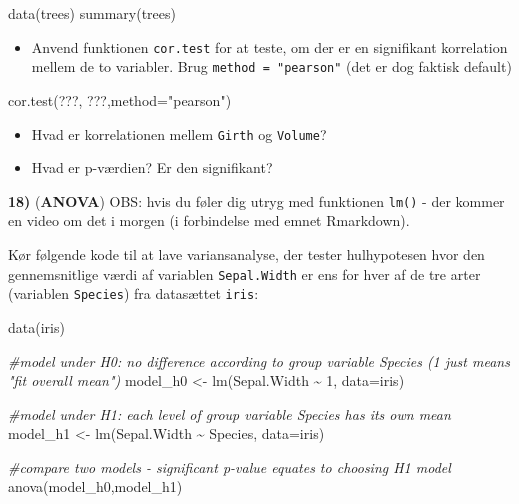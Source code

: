 \documentclass[
]{book}
\newenvironment{Shaded}{\begin{snugshade}}{\end{snugshade}}
\newcommand{\AttributeTok}[1]{\textcolor[rgb]{0.77,0.63,0.00}{#1}}
\newcommand{\CommentTok}[1]{\textcolor[rgb]{0.56,0.35,0.01}{\textit{#1}}}
\newcommand{\DecValTok}[1]{\textcolor[rgb]{0.00,0.00,0.81}{#1}}
\newcommand{\FunctionTok}[1]{\textcolor[rgb]{0.00,0.00,0.00}{#1}}
\newcommand{\NormalTok}[1]{#1}
\newcommand{\OtherTok}[1]{\textcolor[rgb]{0.56,0.35,0.01}{#1}}
\newcommand{\SpecialCharTok}[1]{\textcolor[rgb]{0.00,0.00,0.00}{#1}}
\newcommand{\StringTok}[1]{\textcolor[rgb]{0.31,0.60,0.02}{#1}}
\providecommand{\tightlist}{%
  \setlength{\itemsep}{0pt}\setlength{\parskip}{0pt}}
\begin{document}
\begin{Shaded}
\begin{Highlighting}[]
\FunctionTok{data}\NormalTok{(trees)}
\FunctionTok{summary}\NormalTok{(trees)}
\end{Highlighting}
\end{Shaded}

\begin{itemize}
\tightlist
\item
  Anvend funktionen \texttt{cor.test} for at teste, om der er en signifikant korrelation mellem de to variabler. Brug \texttt{method\ =\ "pearson"} (det er dog faktisk default)
\end{itemize}

\begin{Shaded}
\begin{Highlighting}[]
\FunctionTok{cor.test}\NormalTok{(???, ???,}\AttributeTok{method=}\StringTok{"pearson"}\NormalTok{)}
\end{Highlighting}
\end{Shaded}

\begin{itemize}
\tightlist
\item
  Hvad er korrelationen mellem \texttt{Girth} og \texttt{Volume}?
\item
  Hvad er p-værdien? Er den signifikant?
\end{itemize}

\textbf{18)} (\textbf{ANOVA}) OBS: hvis du føler dig utryg med funktionen \texttt{lm()} - der kommer en video om det i morgen (i forbindelse med emnet Rmarkdown).

Kør følgende kode til at lave variansanalyse, der tester hulhypotesen hvor den gennemsnitlige værdi af variablen \texttt{Sepal.Width} er ens for hver af de tre arter (variablen \texttt{Species}) fra datasættet \texttt{iris}:

\begin{Shaded}
\begin{Highlighting}[]
\FunctionTok{data}\NormalTok{(iris)}

\CommentTok{\#model under H0: no difference according to group variable Species (1 just means "fit overall mean")}
\NormalTok{model\_h0 }\OtherTok{\textless{}{-}} \FunctionTok{lm}\NormalTok{(Sepal.Width }\SpecialCharTok{\textasciitilde{}} \DecValTok{1}\NormalTok{, }\AttributeTok{data=}\NormalTok{iris) }

\CommentTok{\#model under H1: each level of group variable Species has its own mean}
\NormalTok{model\_h1 }\OtherTok{\textless{}{-}} \FunctionTok{lm}\NormalTok{(Sepal.Width }\SpecialCharTok{\textasciitilde{}}\NormalTok{ Species, }\AttributeTok{data=}\NormalTok{iris) }

\CommentTok{\#compare two models {-} significant p{-}value equates to choosing H1 model}
\FunctionTok{anova}\NormalTok{(model\_h0,model\_h1)}
\end{Highlighting}
\end{Shaded}
\end{document}
